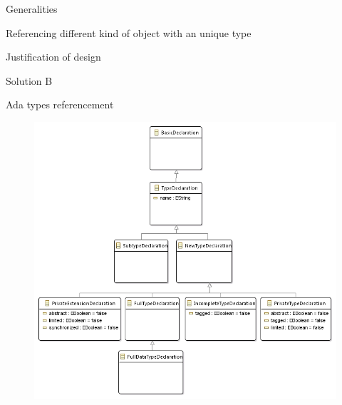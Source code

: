\documentclass[a4paper]{prjdoc}
\begin{document}
\begin{asection}{Generalities}
\begin{asection}{Referencing different kind of object with an unique type}
\begin{asection}{Justification of design}
\begin{asection}{Solution B}
           \end{asection} %
            
        \end{asection} %
         
     \end{asection} %
         
  \end{asection} %
   
  \begin{asection}{Ada types referencement}     
      
     \begin{figure}
     \includegraphics[scale=0.81]{"../../model/Typing hierarchy"}
     \label{fig:TypingHierarchy}
     \end{figure}
   

\end{asection}
\end{document}
